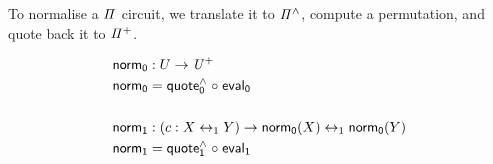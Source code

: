 To normalise a $\mathit{\Pi}$ circuit, we translate it to $\mathit{{\Pi}^{\wedge}}$, compute a permutation, and quote back it to
$\mathit{{\Pi}^{+}}$.

\begin{definition}
  \begin{align*}
    \normt_{0} & : U \to \UPlus                                        \\
    \normt_{0} & = \quoteh_{0} \comp \evalt_{0}                        \\
    \\
    \normt_{1} & : (c : X \iso Y) \to \normt_{0}(X) \iso \normt_{0}(Y) \\
    \normt_{1} & = \quoteh_{1} \comp \evalt_{1}                        \\
  \end{align*}
\end{definition}

